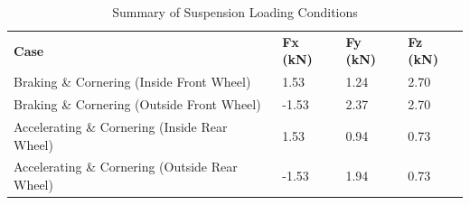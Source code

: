 \documentclass[12pt]{article}
\begin{document}
\begin{table}[h!]
\centering
\caption{Summary of Suspension Loading Conditions}
\label{tab:summary}
\begin{tabular}{llll}
\textbf{Case}                                  & \textbf{Fx (kN)} & \textbf{Fy (kN)} & \textbf{Fz (kN)} \\
Braking \& Cornering (Inside Front Wheel)      & 1.53             & 1.24             & 2.70             \\
Braking \& Cornering (Outside Front Wheel)     & -1.53            & 2.37             & 2.70             \\
Accelerating \& Cornering (Inside Rear Wheel)  & 1.53             & 0.94             & 0.73             \\
Accelerating \& Cornering (Outside Rear Wheel) & -1.53            & 1.94             & 0.73            
\end{tabular}
\end{table}
\end{document}
